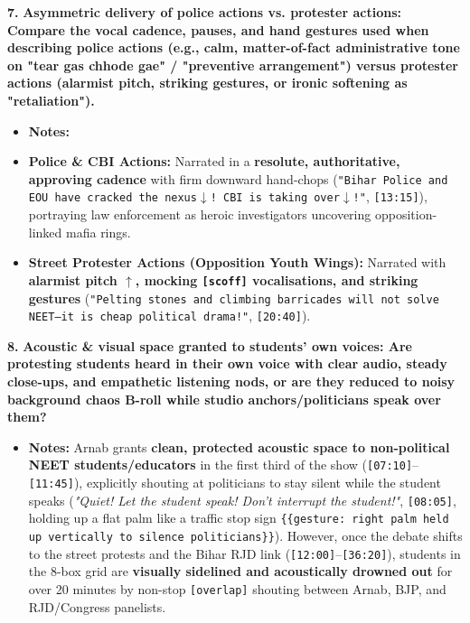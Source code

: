 \documentclass[10pt,a4paper]{article}
\begin{document}
\noindent\textbf{7.} \textbf{Asymmetric delivery of police actions vs. protester actions: Compare the vocal cadence, pauses, and hand gestures used when describing police actions (e.g., calm, matter-of-fact administrative tone on "tear gas chhode gae" / "preventive arrangement") versus protester actions (alarmist pitch, striking gestures, or ironic softening as "retaliation").}\par\smallskip
\begin{itemize}
  \item \textbf{Notes:}
  \item \textbf{Police \& CBI Actions:} Narrated in a \textbf{resolute, authoritative, approving cadence} with firm downward hand-chops (\texttt{"Bihar Police and EOU have cracked the nexus$\downarrow$! CBI is taking over$\downarrow$!"}, \texttt{[13:15]}), portraying law enforcement as heroic investigators uncovering opposition-linked mafia rings.
  \item \textbf{Street Protester Actions (Opposition Youth Wings):} Narrated with \textbf{alarmist pitch \texttt{$\uparrow$}, mocking \texttt{[scoff]} vocalisations, and striking gestures} (\texttt{"Pelting stones and climbing barricades will not solve NEET---it is cheap political drama!"}, \texttt{[20:40]}).
\end{itemize}

\noindent\textbf{8.} \textbf{Acoustic \& visual space granted to students' own voices: Are protesting students heard in their own voice with clear audio, steady close-ups, and empathetic listening nods, or are they reduced to noisy background chaos B-roll while studio anchors/politicians speak over them?}\par\smallskip
\begin{itemize}
  \item \textbf{Notes:}
Arnab grants \textbf{clean, protected acoustic space to non-political NEET students/educators} in the first third of the show (\texttt{[07:10]}--\texttt{[11:45]}), explicitly shouting at politicians to stay silent while the student speaks (\textit{"Quiet! Let the student speak! Don't interrupt the student!"}, \texttt{[08:05]}, holding up a flat palm like a traffic stop sign \texttt{\{\{gesture: right palm held up vertically to silence politicians\}\}}). However, once the debate shifts to the street protests and the Bihar RJD link (\texttt{[12:00]}--\texttt{[36:20]}), students in the 8-box grid are \textbf{visually sidelined and acoustically drowned out} for over 20 minutes by non-stop \texttt{[overlap]} shouting between Arnab, BJP, and RJD/Congress panelists.\par\smallskip
\end{itemize}
\end{document}

